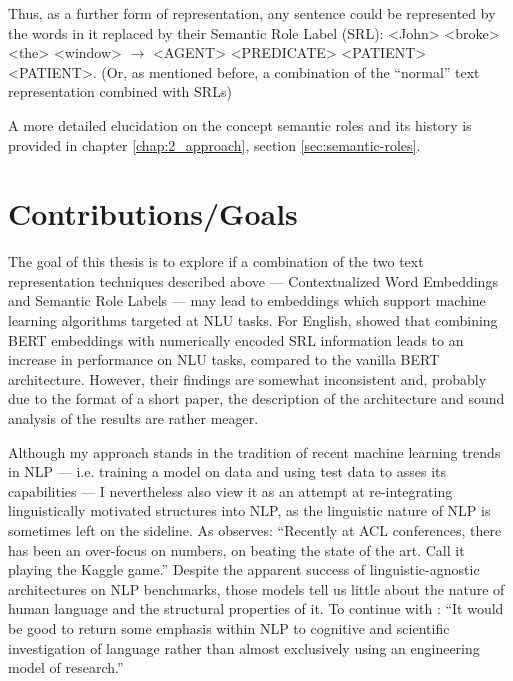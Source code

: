 Thus, as a further form of representation, any sentence could be represented by the words in it
replaced by their Semantic Role Label (SRL): <John> <broke> <the> <window> $\rightarrow$ <AGENT>
<PREDICATE> <PATIENT> <PATIENT>. (Or, as mentioned before, a combination of the ``normal'' text
representation combined with SRLs)

A more detailed elucidation on the concept semantic roles and its history is provided in chapter
\ref{chap:2_approach}, section \ref{sec:semantic-roles}.



\section{Contributions/Goals}

The goal of this thesis is to explore if a combination of the two text representation
techniques described above --- Contextualized Word Embeddings and Semantic Role Labels ---
may lead to embeddings which support machine learning algorithms targeted at NLU tasks. For
English, \cite{zhang2019semantics} showed that combining BERT embeddings with numerically
encoded SRL information leads to an increase in performance on NLU tasks, compared to the
vanilla BERT architecture. However, their findings are somewhat inconsistent and, probably
due to the format of a short paper, the description of the architecture and sound analysis
of the results are rather meager.

Although my approach stands in the tradition of recent machine learning trends in
NLP --- i.e. training a model on data and using test data to asses its capabilities
--- I nevertheless also view it as an attempt at re-integrating linguistically
motivated structures into NLP, as the linguistic nature of NLP is sometimes left
on the sideline. As \cite[p.~702]{manning2015computational} observes: ``Recently
at ACL conferences, there has been an over-focus on numbers, on beating the state
of the art. Call it playing the Kaggle game.'' Despite the apparent success of
linguistic-agnostic architectures on NLP benchmarks, those models tell us little
about the nature of human language and the structural properties of it. To continue
with \citeauthor[p.~706]{manning2015computational}: ``It would be good to return
some emphasis within NLP to cognitive and scientific investigation of language
rather than almost exclusively using an engineering model of research.''

